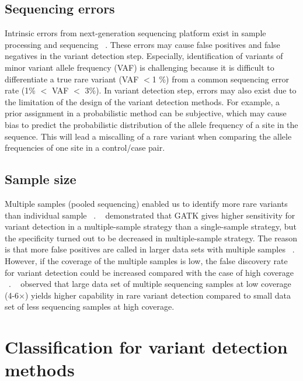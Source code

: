 \documentclass[11pt,reqno]{amsart}
\begin{document}
\subsection{Sequencing errors}

Intrinsic errors from next-generation sequencing platform exist in sample processing and sequencing ~\citep{Olson2015}.
These errors may cause false positives and false negatives in the variant detection step.
Especially, identification of variants of minor variant allele frequency (VAF) is challenging because it is difficult to differentiate a true rare variant (VAF $<$1 \%) from a common sequencing error rate (1\% $<$ VAF $<$ 3\%).
In variant detection step, errors may also exist due to the limitation of the design of the variant detection methods.
For example, a prior assignment in a probabilistic method can be subjective, which may cause bias to predict the probabilistic distribution of the allele frequency of a site in the sequence.
This will lead a miscalling of a rare variant when comparing the allele frequencies of one site in a control/case pair.

\subsection{Sample size}

Multiple samples (pooled sequencing) enabled us to identify more rare variants than individual sample ~\citep{Bao2014, liu2012steps}.
~\citep{liu2013variant} demonstrated that GATK gives higher sensitivity for variant detection in a multiple-sample strategy than a single-sample strategy, but the specificity turned out to be decreased in multiple-sample strategy.
The reason is that more false positives are called in larger data sets with multiple samples ~\citep{Nielsen2011}.
However, if the coverage of the multiple samples is low, the false discovery rate for variant detection could be increased compared with the case of high coverage ~\citep{Cheng2014}.
~\citep{le2011snp} observed that large data set of multiple sequencing samples at low coverage (4-6$\times$) yields higher capability in rare variant detection compared to small data set of less sequencing samples at high coverage.

\section{Classification for variant detection methods}
\end{document}
